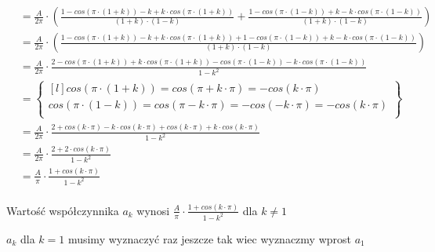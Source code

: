 \begin{task}
\begin{align*}
&=\frac{A}{2\pi} \cdot \left(\frac{1 - cos\left(\pi \cdot \left(1+k\right) \right)- k + k\cdot cos\left(\pi \cdot \left(1+k\right) \right)}{\left(1+k\right)\cdot\left(1-k\right)} + \frac{1 - cos\left(\pi \cdot \left(1-k\right)\right)+ k - k\cdot cos\left(\pi \cdot \left(1-k\right)\right)}{\left(1+k\right)\cdot\left(1-k\right)} \right)\\
&=\frac{A}{2\pi} \cdot \left(\frac{1 - cos\left(\pi \cdot \left(1+k\right) \right)- k + k\cdot cos\left(\pi \cdot \left(1+k\right) \right) + 1 - cos\left(\pi \cdot \left(1-k\right)\right)+ k - k\cdot cos\left(\pi \cdot \left(1-k\right)\right)}{\left(1+k\right)\cdot\left(1-k\right)} \right)\\
&=\frac{A}{2\pi} \cdot \frac{2 - cos\left(\pi \cdot \left(1+k\right) \right) + k\cdot cos\left(\pi \cdot \left(1+k\right) \right) - cos\left(\pi \cdot \left(1-k\right)\right) - k\cdot cos\left(\pi \cdot \left(1-k\right)\right)}{1-k^2}\\
&=\begin{Bmatrix*}[l]
cos\left(\pi\cdot\left(1+k\right)\right)=cos\left(\pi+k \cdot\pi\right)=-cos\left(k\cdot\pi\right)\\
cos\left(\pi\cdot\left(1-k\right)\right)=cos\left(\pi-k \cdot\pi\right)=-cos\left(-k\cdot\pi\right) = -cos\left(k\cdot\pi\right)\\
\end{Bmatrix*}\\
&=\frac{A}{2\pi} \cdot \frac{2 + cos\left(k\cdot\pi \right) - k\cdot cos\left(k\cdot\pi \right) + cos\left(k\cdot\pi\right) + k\cdot cos\left(k\cdot\pi\right)}{1-k^2}\\
&=\frac{A}{2\pi} \cdot \frac{2 + 2\cdot cos\left(k\cdot\pi \right)}{1-k^2}\\
&=\frac{A}{\pi} \cdot \frac{1 + cos\left(k\cdot\pi \right)}{1-k^2}\\
\end{align*}

Wartość współczynnika $a_k$ wynosi $\frac{A}{\pi} \cdot \frac{1 + cos\left(k\cdot\pi \right)}{1-k^2}$ dla $k \neq 1$

$a_k$ dla $k=1$ musimy wyznaczyć raz jeszcze tak wiec wyznaczmy wprost $a_1$


\end{task}
